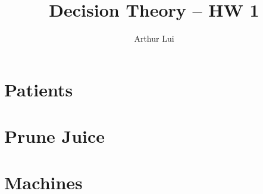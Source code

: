 \documentclass{article}[12pt]
\author{Arthur Lui}
\title{Decision Theory -- HW 1}
\newcommand{\shrink}[2]{\scalebox{#2}{\parbox{\textwidth}{}}}
\begin{document}
\maketitle

\section{Patients}
\shrink{results/doctor.txt}{.75}  \newpage

\section{Prune Juice}
\shrink{results/prunejuice.txt}{.8} \newpage

\section{Machines}
\shrink{results/machine.txt}{.8} \newpage
\end{document}
